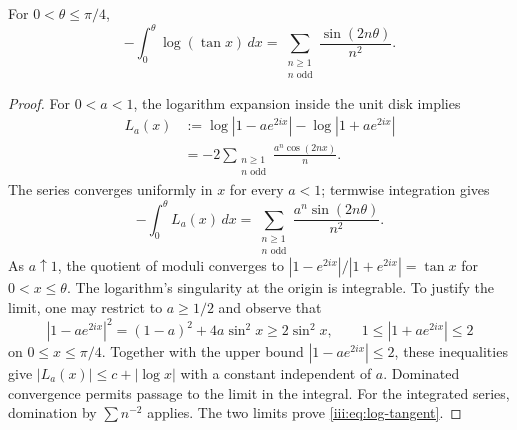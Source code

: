 \begin{lemma}
\label{iii:lem:log-tangent}
For $0<\theta\leq\pi/4$,
\begin{equation}
 -\int_0^\theta\log(\tan x)\,dx
 =\sum_{\substack{n\geq1\\n\text{ odd}}}
      \frac{\sin(2n\theta)}{n^2}.
 \label{iii:eq:log-tangent}
\end{equation}
\end{lemma}
\begin{proof}
For $0<a<1$, the logarithm expansion inside the unit disk implies
\begin{align*}
 L_a(x)
 &:=\log|1-ae^{2ix}|-\log|1+ae^{2ix}|\\
 &=-2\sum_{\substack{n\geq1\\n\text{ odd}}}
       \frac{a^n\cos(2nx)}{n}.
\end{align*}
The series converges uniformly in $x$ for every $a<1$; termwise
integration gives
\[
 -\int_0^\theta L_a(x)\,dx
 =\sum_{\substack{n\geq1\\n\text{ odd}}}
       \frac{a^n\sin(2n\theta)}{n^2}.
\]
As $a\uparrow1$, the quotient of moduli converges to
$|1-e^{2ix}|/|1+e^{2ix}|=\tan x$ for $0<x\leq\theta$.
The logarithm's singularity at the origin is integrable. To justify
the limit, one may restrict to $a\geq1/2$ and observe that
\[
 |1-ae^{2ix}|^2=(1-a)^2+4a\sin^2x
 \geq2\sin^2x,
 \qquad 1\leq|1+ae^{2ix}|\leq2
\]
on $0\leq x\leq\pi/4$. Together with the upper bound
$|1-ae^{2ix}|\leq2$, these inequalities give
$|L_a(x)|\leq c+|\log x|$ with a constant independent of $a$.
Dominated convergence permits passage to the limit in the integral.
For the integrated series, domination by $\sum n^{-2}$ applies.
The two limits prove \eqref{iii:eq:log-tangent}.
\end{proof}

